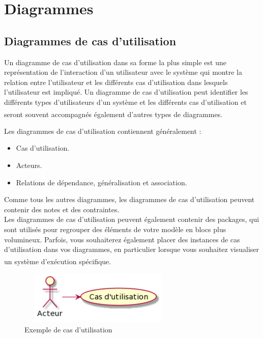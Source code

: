 \documentclass[12pt]{report}
\begin{document}
\newpage

\section{Diagrammes}

\subsection{Diagrammes de cas d'utilisation}

Un diagramme de cas d'utilisation dans sa forme la plus simple est une représentation de l'interaction d'un utilisateur avec le système qui montre la relation entre l'utilisateur et les différents cas d'utilisation dans lesquels l'utilisateur est impliqué. Un diagramme de cas d'utilisation peut identifier les différents types d'utilisateurs d'un système et les différents cas d'utilisation et seront souvent accompagnés également d'autres types de diagrammes.\textsuperscript{\cite{UIS}}

Les diagrammes de cas d'utilisation contiennent généralement :

\begin{itemize}
\item Cas d'utilisation.
\item Acteurs.
\item Relations de dépendance, généralisation et association.
\end{itemize}

Comme tous les autres diagrammes, les diagrammes de cas d'utilisation peuvent contenir des notes et des contraintes.
\\
Les diagrammes de cas d'utilisation peuvent également contenir des packages, qui sont utilisés pour regrouper des éléments de votre modèle en blocs plus volumineux. Parfois, vous souhaiterez également placer des instances de cas d'utilisation dans vos diagrammes, en particulier lorsque vous souhaitez visualiser un système d'exécution spécifique.\textsuperscript{\cite{booch2005unified}}

\vspace{0.2in}

\begin{figure}[h]
\centering
    \includegraphics[width = 3.0in, height = 1.0in]{../Images/usecaseEG.png}
    \caption{Exemple de cas d'utilisation}
\end{figure}
\end{document}
